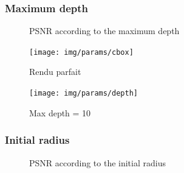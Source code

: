 \documentclass{beamer}
\begin{document}
\begin{frame}
    \frametitle{Maximum depth}

    \begin{minipage}{\textwidth}
        \begin{figure}
            \centering
            \caption{PSNR according to the maximum depth}
        \end{figure}
    \end{minipage}
\end{frame}
\begin{frame}
    \begin{figure}
        \texttt{[image: img/params/cbox]}
        \caption{Rendu parfait}
    \end{figure}
\end{frame}
\begin{frame}
    \begin{figure}
        \texttt{[image: img/params/depth]}
        \caption{Max depth = 10}
    \end{figure}
\end{frame}
\begin{frame}
    \frametitle{Initial radius}
    \begin{minipage}{0.5\textwidth}
    \end{minipage}
    \begin{minipage}{\textwidth}
        \begin{figure}
            \centering
            \caption{PSNR according to the initial radius}
        \end{figure}
    \end{minipage}
\end{frame}
\end{document}
